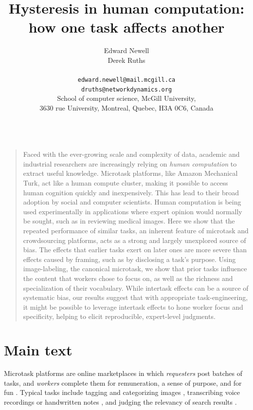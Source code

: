 \documentclass[12pt]{article}
\title{Hysteresis in human computation:\\ how one task affects another}
\author
{Edward Newell \\ Derek Ruths\\
\\
\normalsize{\texttt{edward.newell@mail.mcgill.ca}}\\
\normalsize{\texttt{druths@networkdynamics.org}}\\
\normalsize{School of computer science, McGill University,}\\
\normalsize{3630 rue University, Montreal, Quebec, H3A 0C6, Canada}\\
\\
}
\date{}
\newenvironment{sciabstract}{%
\begin{quote} \bf}
{\end{quote}}
\begin{document}
 


\baselineskip24pt


\maketitle 




\begin{sciabstract}

Faced with the ever-growing scale and complexity of data, academic and 
industrial researchers are increasingly relying on \textit{human computation} 
to extract useful knowledge.  Microtask
platforms, like Amazon Mechanical Turk, act like a human compute cluster,
making it possible to access human cognition quickly and inexpensively. 
This has lead to their broad adoption by social and computer scientists.  
Human computation is being used experimentally in applications
where expert opinion would normally be sought, such as in reviewing 
medical images.
Here we show that the repeated performance of similar tasks, an inherent
feature of microtask and crowdsourcing platforms, acts as a strong
and largely unexplored source of bias.  The effects that earlier tasks exert
on later ones are more severe than effects caused by framing, 
such as by disclosing a task's purpose.  
Using image-labeling, the canonical microtask, we show that prior 
tasks influence the content that workers chose to focus on, as well as the 
richness and specialization of their vocabulary.    
While intertask effects can be a source of systematic bias, our
results suggest that with appropriate task-engineering, it might be possible
to leverage intertask effects to hone worker focus and specificity, helping
to elicit reproducible, expert-level judgments.
\end{sciabstract}

\section*{Main text}
Microtask platforms are online marketplaces in which \textit{requesters} 
post batches of tasks, and \textit{workers} complete them
for remuneration, a sense of purpose, and for fun
\cite{kazai2013analysis,Antin20122925}.  
Typical tasks include tagging and categorizing images 
\cite{6116320,Zhai2012357}, transcribing voice recordings 
\cite{chandler2013breaking,paolacci2010running}
or handwritten notes \cite{Berinsky2012351,Finnerty2013}, and judging the 
relevancy of search results 
\cite{le2010ensuring,grady2010crowdsourcing,alonso2009can,kazai2013analysis}.
\end{document}

